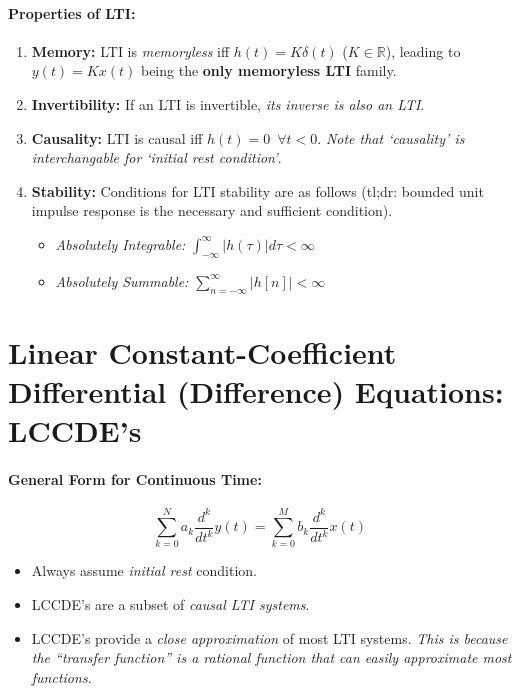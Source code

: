 \documentclass[a4paper,12pt]{report}
\def\reals{\mathbb{R}}
\begin{document}
\paragraph{Properties of LTI: } 
\begin{enumerate}
\item \textbf{Memory: } LTI is \textit{memoryless} iff $h(t) = K\delta(t)$ ($K\in\reals$), leading to $y(t) = Kx(t)$ being the \textbf{only memoryless LTI} family.
\item \textbf{Invertibility: } If an LTI is invertible, \textit{its inverse is also an LTI}. 
\item \textbf{Causality: } LTI is causal iff $h(t) = 0\,\,\,\forall t < 0$. \textit{Note that `causality' is interchangable for `initial rest condition'}.
\item \textbf{Stability: } Conditions for LTI stability are as follows (tl;dr: bounded unit impulse response is the necessary and sufficient condition). 
\begin{itemize}
\item \textit{Absolutely Integrable: } $\int_{-\infty}^\infty |h(\tau)|d\tau < \infty$
\item \textit{Absolutely Summable: } $\sum_{n=-\infty}^\infty |h[n]| < \infty$
\end{itemize}
\end{enumerate}


\section{Linear Constant-Coefficient Differential (Difference) Equations: LCCDE's}

\paragraph{General Form for Continuous Time: } 

\begin{equation}
\sum_{k=0}^N a_k \frac{d^k}{dt^k} y(t) = \sum_{k=0}^{M} b_k \frac{d^k}{dt^k} x(t) 
\end{equation}

\begin{itemize}
\item Always assume \textit{initial rest} condition.
\item LCCDE's are a subset of \textit{causal LTI systems}.
\item LCCDE's provide a \textit{close approximation} of most LTI systems. \textit{This is because the ``transfer function'' is a rational function that can easily approximate most functions}.
\end{itemize}
\end{document}
